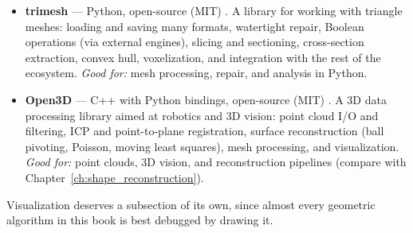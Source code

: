 \begin{itemize}
    STL, OBJ, PLY, Abaqus, Exodus, CGNS, and others) through a single
    unified mesh object, converting cells of any dimension.
    \emph{Good for:} mesh format conversion between meshers, solvers,
    and visualizers.
  \item \textbf{trimesh} --- Python, open-source (MIT) \cite{trimesh}.
    A library for working with triangle meshes: loading and saving many
    formats, watertight repair, Boolean operations (via external
    engines), slicing and sectioning, cross-section extraction, convex
    hull, voxelization, and integration with the rest of the ecosystem.
    \emph{Good for:} mesh processing, repair, and analysis in Python.
  \item \textbf{Open3D} --- C++ with Python bindings, open-source (MIT)
    \cite{open3d}. A 3D data processing library aimed at robotics and
    3D vision: point cloud I/O and filtering, ICP and point-to-plane
    registration, surface reconstruction (ball pivoting, Poisson, moving
    least squares), mesh processing, and visualization.
    \emph{Good for:} point clouds, 3D vision, and reconstruction
    pipelines (compare with Chapter~\ref{ch:shape_reconstruction}).
\end{itemize}

Visualization deserves a subsection of its own, since almost every
geometric algorithm in this book is best debugged by drawing it.

